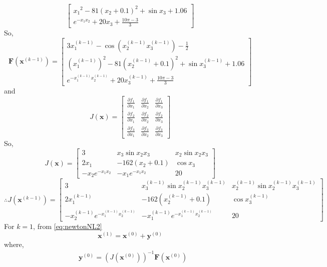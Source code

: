 \documentclass[../main-sheet.tex]{subfiles}
\begin{document}
\begin{ex}
\[\begin{bmatrix}
        {x_1}^2-81(x_2+0.1)^2+\sin x_3+1.06\\[1em]
        e^{-x_1x_2}+20x_3+\frac{10\pi -3}{3}
        \end{bmatrix}
    \]
    So,
    \[
        \mathbf{F}(\mathbf{x}^{(k-1)})=
        \begin{bmatrix}
            3x_1^{(k-1)}-\cos(x_2^{(k-1)}x_3^{(k-1)})-\frac{1}{2}\\[1em]
       \left(x_1^{(k-1)}\right)^2-81(x_2^{(k-1)}+0.1)^2+\sin x_3^{(k-1)}+1.06\\[1em]
        e^{-x_1^{(k-1)}x_2^{(k-1)}}+20x_3^{(k-1)}+\frac{10\pi -3}{3}
        \end{bmatrix}
    \]
    and
    \[
        J(\mathbf{x})=\begin{bmatrix}
            \frac{\partial f_1}{\partial x_1} & \frac{\partial f_1}{\partial x_2} &\frac{\partial f_1}{\partial x_3} \\[1em]
            \frac{\partial f_2}{\partial x_1} & \frac{\partial f_2}{\partial x_2} &\frac{\partial f_2}{\partial x_3} \\[1em]
            \frac{\partial f_3}{\partial x_1} & \frac{\partial f_3}{\partial x_2} &\frac{\partial f_3}{\partial x_3}
        \end{bmatrix}
    \]
    So,
    \[
        J(\mathbf{x})=\begin{bmatrix}
            3 & x_3 \sin x_2x_3 & x_2 \sin x_2 x_3\\[1em]
            2x_1 & -162(x_2+0.1) & \cos x_3\\[1em]
            -x_2e^{-x_1x_2} & -x_1e^{-x_1x_2} & 20
        \end{bmatrix}
    \]
    \[
        \therefore J(\mathbf{x}^{(k-1)})=\begin{bmatrix}
            3 & x_3^{(k-1)} \sin x_2^{(k-1)}x_3^{(k-1)} & x_2^{(k-1)} \sin x_2^{(k-1)} x_3^{(k-1)}\\[1em]
            2x_1^{(k-1)} & -162(x_2^{(k-1)}+0.1) & \cos x_3^{(k-1)}\\[1em]
            -x_2^{(k-1)}e^{-x_1^{(k-1)}x_2^{(k-1)}} & -x_1^{(k-1)}e^{-x_1^{(k-1)}x_2^{(k-1)}} & 20
        \end{bmatrix}
    \]
    For \(k=1\), from \eqref{eq:newtonNL2}
    \begin{equation}
        \mathbf{x}^{(1)}=\mathbf{x}^{(0)}+\mathbf{y}^{(0)}
        \label{eq:newtonNL4}
    \end{equation}
    where,
    \begin{align*}
        &\mathbf{y}^{(0)}=\left(J\left( \mathbf{x}^{(0)} \right)\right)^{-1}\mathbf{F}\left( \mathbf{x}^{(0)} \right)\\

\end{align*}
\end{ex}
\end{document}

